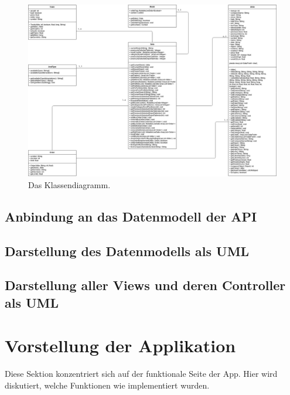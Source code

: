 \documentclass[10pt]{scrartcl}
\begin{document}
\begin{figure}[H]
	\centering
	\includegraphics[width=1\textwidth]{Bilder/Diagramme/Klassendiagramm.jpg}
	\caption{Das Klassendiagramm.}
\end{figure}

\subsection{Anbindung an das Datenmodell der API}

\subsection{Darstellung des Datenmodells als UML}

\subsection{Darstellung aller Views und deren Controller als UML}

\section{Vorstellung der Applikation}
Diese Sektion konzentriert sich auf der funktionale Seite der App. Hier wird diskutiert, welche Funktionen wie implementiert wurden.
\end{document}
